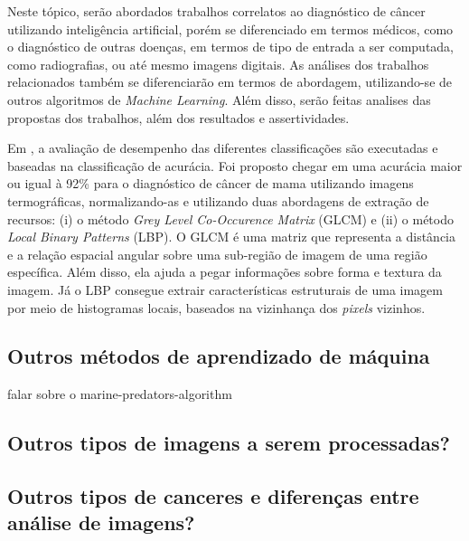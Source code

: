 Neste tópico, serão abordados trabalhos correlatos ao diagnóstico de câncer utilizando inteligência artificial, porém se diferenciado em termos médicos, como o diagnóstico de outras doenças, em termos de tipo de entrada a ser computada, como radiografias, ou até mesmo imagens digitais. As análises dos trabalhos relacionados também se diferenciarão em termos de abordagem, utilizando-se de outros algoritmos de \textit{Machine Learning}. Além disso, serão feitas analises das propostas dos trabalhos, além dos resultados e assertividades.


Em , a avaliação de desempenho das diferentes classificações são executadas e baseadas na classificação de acurácia. Foi proposto chegar em uma acurácia maior ou igual à 92\% para o diagnóstico de câncer de mama utilizando imagens termográficas, normalizando-as e utilizando duas abordagens de extração de recursos: (i) o método \textit{Grey Level Co-Occurence Matrix} (GLCM) e (ii) o método \textit{Local Binary Patterns} (LBP). O GLCM é uma matriz que representa a distância e a relação espacial angular sobre uma sub-região de imagem de uma região específica. Além disso, ela ajuda a pegar informações sobre forma e textura da imagem. Já o LBP consegue extrair características estruturais de uma imagem por meio de histogramas locais, baseados na vizinhança dos \textit{pixels} vizinhos.







\subsection{Outros métodos de aprendizado de máquina}
falar sobre o marine-predators-algorithm
\subsection{Outros tipos de imagens a serem processadas?}
\subsection{Outros tipos de canceres e diferenças entre análise de imagens?}


